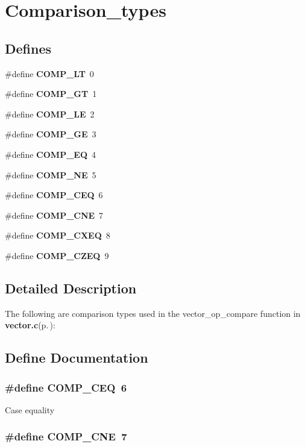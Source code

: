 \section{Comparison\_\-types}
\label{group__comparison__types}
\subsection*{Defines}
\begin{CompactItemize}
\item 
\#define {\bf COMP\_\-LT}\ 0
\item 
\#define {\bf COMP\_\-GT}\ 1
\item 
\#define {\bf COMP\_\-LE}\ 2
\item 
\#define {\bf COMP\_\-GE}\ 3
\item 
\#define {\bf COMP\_\-EQ}\ 4
\item 
\#define {\bf COMP\_\-NE}\ 5
\item 
\#define {\bf COMP\_\-CEQ}\ 6
\item 
\#define {\bf COMP\_\-CNE}\ 7
\item 
\#define {\bf COMP\_\-CXEQ}\ 8
\item 
\#define {\bf COMP\_\-CZEQ}\ 9
\end{CompactItemize}


\subsection{Detailed Description}
The following are comparison types used in the vector\_\-op\_\-compare function in {\bf vector.c}{\rm (p.\,\pageref{vector_8c})}: 

\subsection{Define Documentation}
\subsubsection{\setlength{\rightskip}{0pt plus 5cm}\#define COMP\_\-CEQ\ 6}\label{group__comparison__types_a6}


Case equality 
\subsubsection{\setlength{\rightskip}{0pt plus 5cm}\#define COMP\_\-CNE\ 7}\label{group__comparison__types_a7}


